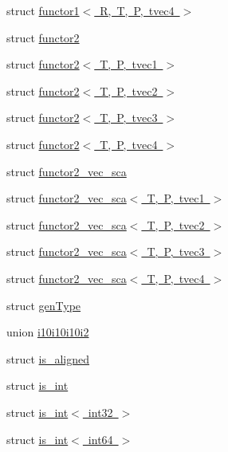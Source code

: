 \begin{DoxyCompactItemize}
\item 
struct \mbox{\hyperlink{structglm_1_1detail_1_1functor1_3_01_r_00_01_t_00_01_p_00_01tvec4_01_4}{functor1$<$ R, T, P, tvec4 $>$}}
\item 
struct \mbox{\hyperlink{structglm_1_1detail_1_1functor2}{functor2}}
\item 
struct \mbox{\hyperlink{structglm_1_1detail_1_1functor2_3_01_t_00_01_p_00_01tvec1_01_4}{functor2$<$ T, P, tvec1 $>$}}
\item 
struct \mbox{\hyperlink{structglm_1_1detail_1_1functor2_3_01_t_00_01_p_00_01tvec2_01_4}{functor2$<$ T, P, tvec2 $>$}}
\item 
struct \mbox{\hyperlink{structglm_1_1detail_1_1functor2_3_01_t_00_01_p_00_01tvec3_01_4}{functor2$<$ T, P, tvec3 $>$}}
\item 
struct \mbox{\hyperlink{structglm_1_1detail_1_1functor2_3_01_t_00_01_p_00_01tvec4_01_4}{functor2$<$ T, P, tvec4 $>$}}
\item 
struct \mbox{\hyperlink{structglm_1_1detail_1_1functor2__vec__sca}{functor2\+\_\+vec\+\_\+sca}}
\item 
struct \mbox{\hyperlink{structglm_1_1detail_1_1functor2__vec__sca_3_01_t_00_01_p_00_01tvec1_01_4}{functor2\+\_\+vec\+\_\+sca$<$ T, P, tvec1 $>$}}
\item 
struct \mbox{\hyperlink{structglm_1_1detail_1_1functor2__vec__sca_3_01_t_00_01_p_00_01tvec2_01_4}{functor2\+\_\+vec\+\_\+sca$<$ T, P, tvec2 $>$}}
\item 
struct \mbox{\hyperlink{structglm_1_1detail_1_1functor2__vec__sca_3_01_t_00_01_p_00_01tvec3_01_4}{functor2\+\_\+vec\+\_\+sca$<$ T, P, tvec3 $>$}}
\item 
struct \mbox{\hyperlink{structglm_1_1detail_1_1functor2__vec__sca_3_01_t_00_01_p_00_01tvec4_01_4}{functor2\+\_\+vec\+\_\+sca$<$ T, P, tvec4 $>$}}
\item 
struct \mbox{\hyperlink{structglm_1_1detail_1_1gen_type}{gen\+Type}}
\item 
union \mbox{\hyperlink{unionglm_1_1detail_1_1i10i10i10i2}{i10i10i10i2}}
\item 
struct \mbox{\hyperlink{structglm_1_1detail_1_1is__aligned}{is\+\_\+aligned}}
\item 
struct \mbox{\hyperlink{structglm_1_1detail_1_1is__int}{is\+\_\+int}}
\item 
struct \mbox{\hyperlink{structglm_1_1detail_1_1is__int_3_01int32_01_4}{is\+\_\+int$<$ int32 $>$}}
\item 
struct \mbox{\hyperlink{structglm_1_1detail_1_1is__int_3_01int64_01_4}{is\+\_\+int$<$ int64 $>$}}

\end{DoxyCompactItemize}
